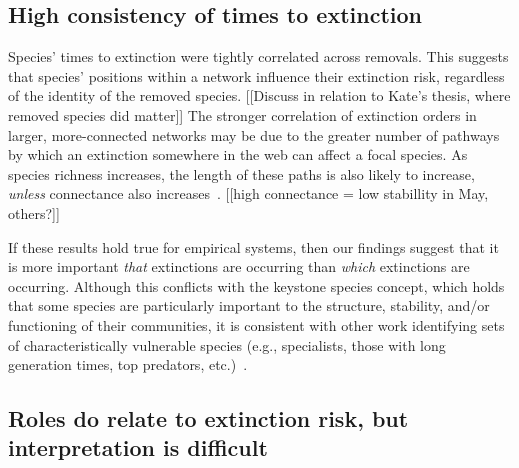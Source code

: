 \documentclass[12pt]{article}
\begin{document}
 	\subsection*{High consistency of times to extinction}

		Species' times to extinction were tightly correlated across removals. This suggests that species' positions within a network influence their extinction risk, regardless of the identity of the removed species.  [[Discuss in relation to Kate's thesis, where removed species did matter]] The stronger correlation of extinction orders in larger, more-connected networks may be due to the greater number of pathways by which an extinction somewhere in the web can affect a focal species. As species richness increases, the length of these paths is also likely to increase, \emph{unless} connectance also increases~\citep{}. [[high connectance = low stabillity in May, others?]]


		If these results hold true for empirical systems, then our findings suggest that it is more important \emph{that} extinctions are occurring than \emph{which} extinctions are occurring. Although this conflicts with the keystone species concept, which holds that some species are particularly important to the structure, stability, and/or functioning of their communities, it is consistent with other work identifying sets of characteristically vulnerable species (e.g., specialists, those with long generation times, top predators, etc.)~\citep{}.


	\subsection*{Roles do relate to extinction risk, but interpretation is difficult}
\end{document}
